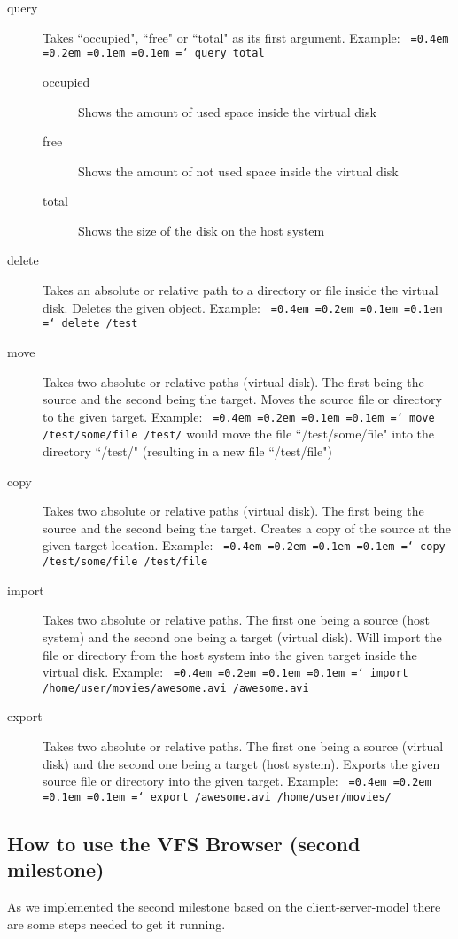 \documentclass[a4paper,12pt]{article}
\newcommand*\justify{%
  \fontdimen2\font=0.4em%
  \fontdimen3\font=0.2em%
  \fontdimen4\font=0.1em%
  \fontdimen7\font=0.1em%
  \hyphenchar\font=`\-%
}
\newcommand{\mono}[1]{\texttt{\justify #1}}
\begin{document}
\begin{description}
    \item [query] Takes ``occupied", ``free" or ``total" as its first argument. Example: \mono{query total}
    \begin{description}
        \item [occupied] Shows the amount of used space inside the virtual disk
        \item [free] Shows the amount of not used space inside the virtual disk
        \item [total] Shows the size of the disk on the host system
    \end{description}
    \item [delete] Takes an absolute or relative path to a directory or file inside the virtual disk. Deletes the given object. Example: \mono{delete /test}
    \item [move] Takes two absolute or relative paths (virtual disk). The first being the source and the second being the target. Moves the source file or directory to the given target. Example: \mono{move /test/some/file /test/} would move the file ``/test/some/file" into the directory ``/test/" (resulting in a new file ``/test/file")
    \item [copy] Takes two absolute or relative paths (virtual disk). The first being the source and the second being the target. Creates a copy of the source at the given target location. Example: \mono{copy /test/some/file /test/file}
    \item [import] Takes two absolute or relative paths. The first one being a source (host system) and the second one being a target (virtual disk). Will import the file or directory from the host system into the given target inside the virtual disk. Example: \mono{import /home/user/movies/awesome.avi /awesome.avi}
    \item [export] Takes two absolute or relative paths. The first one being a source (virtual disk) and the second one being a target (host system). Exports the given source file or directory into the given target. Example: \mono{export /awesome.avi /home/user/movies/}
\end{description}

\subsection{How to use the VFS Browser (second milestone)}
As we implemented the second milestone based on the client-server-model there are some steps needed to get it running.
\end{document}
